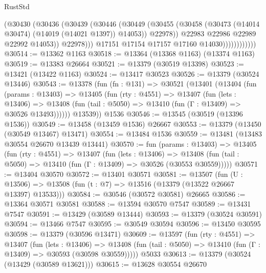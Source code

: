 \begin{lexlean}{RustStd}
\begin{coremodule}
                              (@30430
                                (@30436
                                  (@30439
                                    (@30446
                                      (@30449
                                        (@30455
                                          (@30458
                                            (@30473 (@14014 @30474) (@14019 (@14021 @1397)) @14053))
                                          @22978))
                                      @22983
                                      @22986
                                      @22989
                                      @22992
                                      @14053))
                                  @22978)))
                            @17151
                            @17154
                            @17157
                            @17160
                            @14030))))))))))))
@30514 := @13362 @1163
@30518 := @13364 (@13368 @1163) (@13374 @1163)
@30519 := @13383 @26664
@30521 := @13379 (@30519 @13398)
@30523 := @13421 (@13422 @1163)
@30524 := @13417 @30523
@30526 := @13379 (@30524 @13446)
@30543 := @13378
    (fun (fn : @131) =>
    @30521
      (@13401
        (@13404
          (fun (params : @13403) =>
          @13405
            (fun (rty : @4551) =>
            @13407
              (fun (lets : @13406) =>
              @13408 (fun (tail : @5050) => @13410 (fun (Γ : @13409) => @30526 @13493))))))
        @13539))
    @1536
@30546 := @13545 (@30519 (@13396 @1536))
@30549 := @13458 (@13459 @1536) @26667
@30553 := @13379 (@13450 (@30549 @13467) @13471)
@30554 := @13484 @1536
@30559 := @13481 (@13483 @30554 @26670 @13439 @13441)
@30570 := fun (params : @13403) =>
  @13405
    (fun (rty : @4551) =>
    @13407
      (fun (lets : @13406) =>
      @13408 (fun (tail : @5050) => @13410 (fun (Γ : @13409) => @30526 (@30553 @30559)))))
@30571 := @13404 @30570
@30572 := @13401 @30571
@30581 := @13507
    (fun (U : @13506) => @13508 (fun (t : @7) => @13516 (@13379 (@13522 @26667 @13397) @13533)))
@30584 := @30546 (@30572 @30581) @26665
@30586 := @13364 @30571 @30581
@30588 := @13594 @30570 @7547
@30589 := @13431 @7547
@30591 := @13429 (@30589 @13444)
@30593 := @13379 (@30524 @30591)
@30594 := @13466 @7547
@30595 := @30549 @30594
@30596 := @13450 @30595
@30598 := @13379 (@30596 @13471)
@30609 := @13597
    (fun (rty : @4551) =>
    @13407
      (fun (lets : @13406) =>
      @13408 (fun (tail : @5050) => @13410 (fun (Γ : @13409) => @30593 (@30598 @30559)))))
    @5033
@30613 := @13379 (@30524 (@13429 (@30589 @13621)))
@30615 := @13628 @30554 @26670

\end{coremodule}
\end{lexlean}
